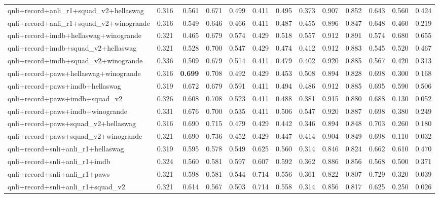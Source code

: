 \begin{table}[t]
\begin{tabular}{lrrrrrrrrrrrr}
    qnli+record+anli\_r1+squad\_v2+hellaswag & 0.316 & 0.561 & 0.671 & 0.499 & 0.411 & 0.495 & 0.373 & 0.907 & 0.852 & 0.643 & 0.560 & 0.424 \\
    qnli+record+anli\_r1+squad\_v2+winogrande & 0.316 & 0.549 & 0.646 & 0.466 & 0.411 & 0.487 & 0.455 & 0.896 & 0.847 & 0.648 & 0.460 & 0.219 \\
    qnli+record+imdb+hellaswag+winogrande & 0.321 & 0.465 & 0.679 & 0.574 & 0.429 & 0.518 & 0.557 & 0.912 & 0.891 & 0.574 & 0.680 & 0.655 \\
    qnli+record+imdb+squad\_v2+hellaswag & 0.321 & 0.528 & 0.700 & 0.547 & 0.429 & 0.474 & 0.412 & 0.912 & 0.883 & 0.545 & 0.520 & 0.467 \\
    qnli+record+imdb+squad\_v2+winogrande & 0.336 & 0.509 & 0.679 & 0.514 & 0.411 & 0.479 & 0.402 & 0.920 & 0.885 & 0.567 & 0.420 & 0.313 \\
    qnli+record+paws+hellaswag+winogrande & 0.316 & \textbf{0.699} & 0.708 & 0.492 & 0.429 & 0.453 & 0.508 & 0.894 & 0.828 & 0.698 & 0.300 & 0.168 \\
    qnli+record+paws+imdb+hellaswag & 0.319 & 0.672 & 0.679 & 0.591 & 0.411 & 0.494 & 0.486 & 0.912 & 0.885 & 0.695 & 0.590 & 0.506 \\
    qnli+record+paws+imdb+squad\_v2 & 0.326 & 0.608 & 0.708 & 0.523 & 0.411 & 0.488 & 0.381 & 0.915 & 0.880 & 0.688 & 0.130 & 0.052 \\
    qnli+record+paws+imdb+winogrande & 0.331 & 0.676 & 0.700 & 0.535 & 0.411 & 0.506 & 0.547 & 0.920 & 0.887 & 0.698 & 0.380 & 0.249 \\
    qnli+record+paws+squad\_v2+hellaswag & 0.316 & 0.690 & 0.715 & 0.479 & 0.429 & 0.442 & 0.346 & 0.894 & 0.848 & 0.703 & 0.260 & 0.180 \\
    qnli+record+paws+squad\_v2+winogrande & 0.321 & 0.690 & 0.736 & 0.452 & 0.429 & 0.447 & 0.414 & 0.904 & 0.849 & 0.698 & 0.110 & 0.032 \\
    qnli+record+snli+anli\_r1+hellaswag & 0.319 & 0.595 & 0.578 & 0.549 & 0.625 & 0.560 & 0.314 & 0.846 & 0.824 & 0.662 & 0.610 & 0.470 \\
    qnli+record+snli+anli\_r1+imdb & 0.324 & 0.560 & 0.581 & 0.597 & 0.607 & 0.592 & 0.362 & 0.886 & 0.856 & 0.568 & 0.500 & 0.371 \\
    qnli+record+snli+anli\_r1+paws & 0.321 & 0.598 & 0.581 & 0.544 & 0.714 & 0.556 & 0.361 & 0.822 & 0.807 & 0.729 & 0.320 & 0.039 \\
    qnli+record+snli+anli\_r1+squad\_v2 & 0.321 & 0.614 & 0.567 & 0.503 & 0.714 & 0.558 & 0.314 & 0.856 & 0.817 & 0.625 & 0.250 & 0.026 \\

\end{tabular}
\end{table}
